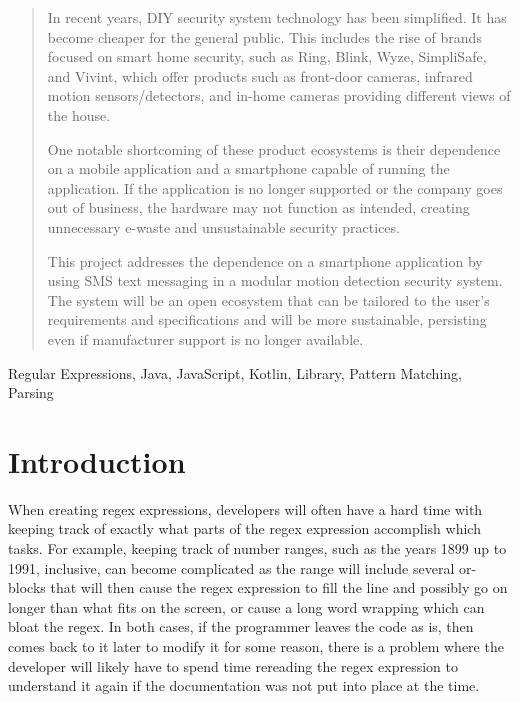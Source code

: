 \documentclass[conference]{IEEEtran}
\begin{document}
\begin{abstract}
    In recent years, DIY security system technology has been simplified. It has become cheaper for the general public. 
    This includes the rise of brands focused on smart home security, such as Ring, Blink, Wyze, SimpliSafe, and Vivint, 
    which offer products such as front-door cameras, infrared motion sensors/detectors, and in-home cameras 
    providing different views of the house.

    One notable shortcoming of these product ecosystems is their dependence on a mobile application and a smartphone 
    capable of running the application. If the application is no longer supported or the company goes out of business, 
    the hardware may not function as intended, creating unnecessary e-waste and unsustainable security practices.

    This project addresses the dependence on a smartphone application by using SMS text messaging in a modular motion 
    detection security system. The system will be an open ecosystem that can be tailored to the user's requirements and 
    specifications and will be more sustainable, persisting even if manufacturer support is no longer available.

\end{abstract}

\begin{IEEEkeywords}
    Regular Expressions, Java, JavaScript, Kotlin, Library, Pattern Matching, Parsing
\end{IEEEkeywords}

\section{Introduction}
When creating regex expressions, developers will often have a hard time with keeping track of exactly
what parts of the regex expression accomplish which tasks. For example, keeping track of number ranges,
such as the years 1899 up to 1991, inclusive, can become complicated as the range will include several or-blocks that
will then cause the regex expression to fill the line and possibly go on longer than what fits on the screen,
or cause a long word wrapping which can bloat the regex.
In both cases, if the programmer leaves the code as is, then comes back to it later to modify it for some reason,
there is a problem where the developer will likely have to spend time rereading the regex expression to understand
it again if the documentation was not put into place at the time.
\end{document}
